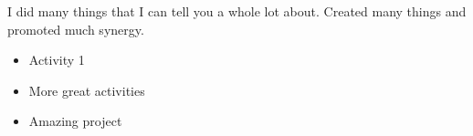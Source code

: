 \noindent I did many things that I can tell you a whole lot about. Created many things and promoted much synergy.
\begin{itemize}
    \item Activity 1
    \item More great activities
    \item Amazing project
\end{itemize}
